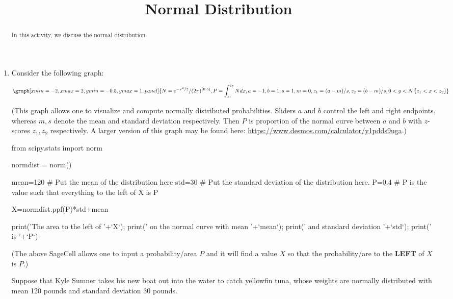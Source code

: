\documentclass{ximera}
\title{Normal Distribution}
\begin{document}
      
\begin{abstract}
      
In this activity, we discuss the normal distribution.
      
\end{abstract}
      
\maketitle
      
 
\begin{enumerate}

\item Consider the following graph:

\begin{onlineOnly}
$$\graph[xmin=-2,xmax=2,ymin=-0.5,ymax=1, panel]{N=e^{-x^2/2}/(2\pi)^{(0.5)}, P=\int_{z_1}^{z_2} N dx, a=-1, b=1, s=1, m=0, z_1=(a-m)/s, z_2=(b-m)/s, 0<y<N\left\{z_1<x<z_2\right\}}$$
\end{onlineOnly}
(This graph allows one to visualize and compute normally distributed probabilities.  Sliders $a$ and $b$ control the left and right endpoints, whereas $m, s$ denote the mean and standard deviation respectively.  Then $P$ is proportion of the normal curve between $a$ and $b$ with $z$-scores $z_1, z_2$ respectively.  A larger version of this graph may be found here: \url{https://www.desmos.com/calculator/y1pdds9uga}.)


\begin{sageCell}
from scipy.stats import norm

normdist = norm()

mean=120 # Put the mean of the distribution here
std=30  # Put the standard deviation of the distribution here.
P=0.4  # P is the value such that everything to the left of X is P

X=normdist.ppf(P)*std+mean

print('The area to the left of '+`X`); print(' on the normal curve with mean '+`mean`); print(' and standard deviation '+`std`); print(' is  '+`P`)
\end{sageCell}
(The above SageCell allows one to input a probability/area $P$ and it will find a value $X$ so that the probability/are to the \textbf{LEFT} of $X$ is $P$.)




Suppose that Kyle Sumner takes his new boat out into the water to catch yellowfin tuna, whose weights are normally distributed with mean 120 pounds and standard deviation 30 pounds.  


\end{enumerate}
\end{document}
